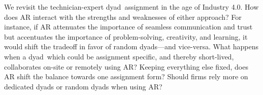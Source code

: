 \documentclass[msom,nonblindrev]{01 latex/class/informs3}
\begin{document}

We revisit the technician-expert dyad\ assignment in the age of Industry 4.0. How does AR interact with the strengths and weaknesses of either approach? For instance, if AR attenuates the importance of seamless communication and trust but accentuates the importance of problem-solving, creativity, and learning, it would shift the tradeoff in favor of random dyads---and vice-versa. What happens when a dyad\, which could be assignment specific, and thereby short-lived, collaborates on-site or remotely using AR? Keeping everything else fixed, does AR shift the balance towards one assignment form? Should firms rely more on dedicated dyads or random dyads when using AR?

\end{document}
